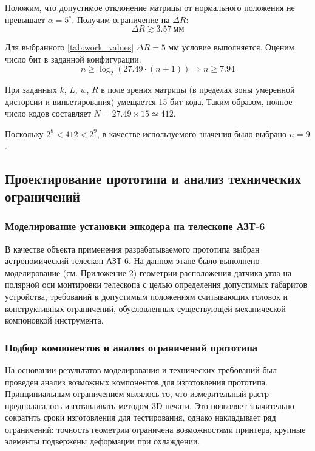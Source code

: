 Положим, что допустимое отклонение матрицы от нормального положения не превышает $\alpha = 5^\circ$. Получим ограничение на $\Delta R$:
\begin{equation*}
    \Delta R \gtrsim 3.57~\text{мм}
\end{equation*}

Для выбранного \ref{tab:work_values} $\Delta R = 5$ мм условие выполняется. Оценим число бит в заданной конфигурации:
\begin{equation*}
    n \geq \log_2\left(27.49\cdot(n+1)\right) \Rightarrow n \geq 7.94
\end{equation*}

При заданных $k$, $L$, $w$, $R$ в поле зрения матрицы (в пределах зоны умеренной дисторсии и виньетирования) умещается 15 бит кода. Таким образом, полное число кодов составляет $N = 27.49 \times 15 \simeq 412$.

Поскольку $2^8 < 412 < 2^9$, в качестве используемого значения было выбрано $n = 9$.
\subsection{Проектирование прототипа и анализ технических ограничений}

\subsubsection{Моделирование установки энкодера на телескопе АЗТ-6}

В качестве объекта применения разрабатываемого прототипа выбран астрономический телескоп АЗТ-6. На данном этапе было выполнено моделирование (см. \hyperref[sec:application2]{Приложение 2}) геометрии расположения датчика угла на полярной оси монтировки телескопа с целью определения допустимых габаритов устройства, требований к допустимым положениям считывающих головок и конструктивных ограничений, обусловленных существующей механической компоновкой инструмента.

\subsubsection{Подбор компонентов и анализ ограничений прототипа}

На основании результатов моделирования и технических требований был проведен анализ возможных компонентов для изготовления прототипа. Принципиальным ограничением являлось то, что измерительный растр предполагалось изготавливать методом 3D-печати. Это позволяет значительно сократить сроки изготовления для тестирования, однако накладывает ряд ограничений: точность геометрии ограничена возможностями принтера, крупные элементы подвержены деформации при охлаждении.

